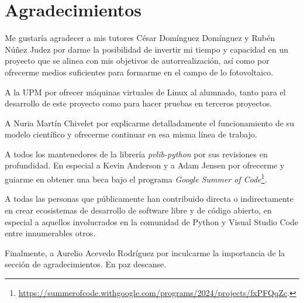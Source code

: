 \chapter*{Agradecimientos} \label{chp:agrad}

Me gustaría agradecer a mis tutores César Domínguez Domínguez y Rubén Núñez Judez por darme la posibilidad de invertir mi tiempo y capacidad en un proyecto que se alinea con mis objetivos de autorrealización, así como por ofrecerme medios suficientes para formarme en el campo de lo fotovoltaico.

A la UPM por ofrecer máquinas virtuales de Linux al alumnado, tanto para el desarrollo de este proyecto como para hacer pruebas en terceros proyectos.

A Nuria Martín Chivelet por explicarme detalladamente el funcionamiento de su modelo científico y ofrecerme continuar en esa misma línea de trabajo.

A todos los mantenedores de la librería \textit{pvlib-python} por sus revisiones en profundidad. En especial a Kevin Anderson y a Adam Jensen por ofrecerme y guiarme en obtener una beca bajo el programa \textit{Google Summer of Code}\footnote{\url{https://summerofcode.withgoogle.com/programs/2024/projects/fxPFQqZc}.}.

A todas las personas que públicamente han contribuido directa o indirectamente en crear ecosistemas de desarrollo de software libre y de código abierto, en especial a aquellos involucrados en la comunidad de Python y Visual Studio Code entre innumerables otros.

Finalmente, a Aurelio Acevedo Rodríguez por inculcarme la importancia de la sección de agradecimientos. En paz descanse.
